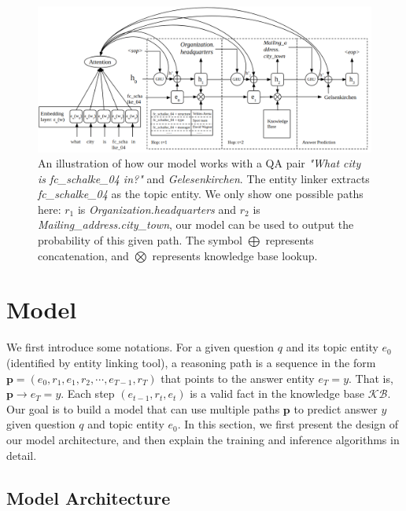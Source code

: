 \begin{figure}[t]
\includegraphics[width=2.1\columnwidth]{figs/model.png}
\caption{\fontsize{10}{12}\selectfont An illustration of how our model works with a QA pair \textit{"What city is fc\_schalke\_04 in?"} and \textit{Gelesenkirchen}. The entity linker extracts \textit{fc\_schalke\_04} as the topic entity. We only show one possible paths here: $r_1$ is \textit{Organization.headquarters} and $r_2$ is \textit{Mailing\_address.city\_town}, our model can be used to output the probability of this given path. The symbol $\bigoplus$ represents concatenation, and $\bigotimes$ represents knowledge base lookup. }
\label{fig:model}
\end{figure}


\section{Model}
We first introduce some notations. For a given question $q$ and its topic entity $e_0$ (identified by entity linking tool), a reasoning path is a sequence in the form $\mathbf{p} = (e_0, r_{1},e_{1},r_{2}, \cdots,e_{T-1}, r_{T})$ that points to the answer entity $e_T=y$. That is, $\mathbf{p}\rightarrow e_T=y$. Each step $(e_{t-1},r_t,e_t)$ is a valid fact in the knowledge base $\mathcal{KB}$. Our goal is to build a model that can use multiple paths $\mathbf{p}$ to predict answer $y$ given question $q$ and topic entity $e_0$. In this section, we first present the design of our model architecture, and then explain the training and inference algorithms in detail. 

\subsection{Model Architecture}





